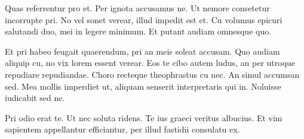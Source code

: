 Quas referrentur pro et. Per ignota accusamus ne. Ut nemore consetetur incorrupte pri. No vel sonet verear, illud impedit est et. Cu volumus epicuri salutandi duo, mei in legere minimum. Et putant audiam omnesque quo.

Et pri habeo feugait quaerendum, pri an meis soleat accusam. Quo audiam aliquip cu, no vix lorem essent verear. Eos te cibo autem ludus, an per utroque repudiare repudiandae. Choro recteque theophrastus cu nec. An simul accumsan sed. Mea mollis imperdiet ut, aliquam senserit interpretaris qui in. Noluisse iudicabit sed ne.

Pri odio erat te. Ut nec soluta ridens. Te ius graeci veritus albucius. Et vim sapientem appellantur efficiantur, per illud fastidii consulatu ex.
